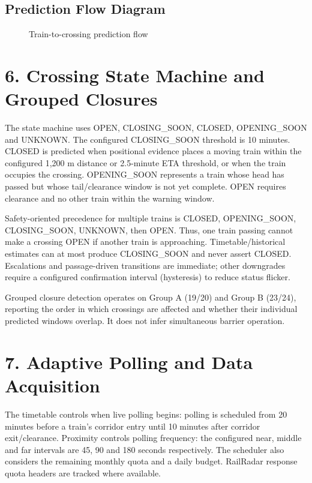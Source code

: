 \documentclass[12pt,a4paper]{report}
\begin{document}
\section{Prediction Flow Diagram}
\begin{figure}[H]\centering
{}\caption{Train-to-crossing prediction flow}\end{figure}
\chapter{6. Crossing State Machine and Grouped Closures}
The state machine uses OPEN, CLOSING\_SOON, CLOSED, OPENING\_SOON and UNKNOWN. The configured CLOSING\_SOON threshold is 10 minutes. CLOSED is predicted when positional evidence places a moving train within the configured 1,200 m distance or 2.5-minute ETA threshold, or when the train occupies the crossing. OPENING\_SOON represents a train whose head has passed but whose tail/clearance window is not yet complete. OPEN requires clearance and no other train within the warning window.

Safety-oriented precedence for multiple trains is CLOSED, OPENING\_SOON, CLOSING\_SOON, UNKNOWN, then OPEN. Thus, one train passing cannot make a crossing OPEN if another train is approaching. Timetable/historical estimates can at most produce CLOSING\_SOON and never assert CLOSED. Escalations and passage-driven transitions are immediate; other downgrades require a configured confirmation interval (hysteresis) to reduce status flicker.

Grouped closure detection operates on Group A (19/20) and Group B (23/24), reporting the order in which crossings are affected and whether their individual predicted windows overlap. It does not infer simultaneous barrier operation.

\chapter{7. Adaptive Polling and Data Acquisition}
The timetable controls when live polling begins: polling is scheduled from 20 minutes before a train's corridor entry until 10 minutes after corridor exit/clearance. Proximity controls polling frequency: the configured near, middle and far intervals are 45, 90 and 180 seconds respectively. The scheduler also considers the remaining monthly quota and a daily budget. RailRadar response quota headers are tracked where available.
\end{document}

